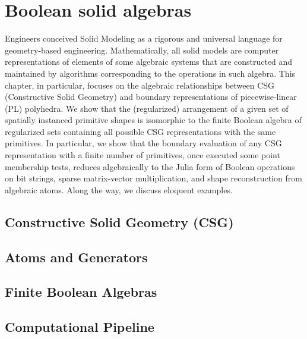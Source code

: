 
\chapter{Boolean solid algebras}
\label{chapt:8}

Engineers conceived Solid Modeling as a rigorous and universal language for geometry-based engineering. Mathematically, all solid models are computer representations of elements of some algebraic systems that are constructed and maintained by algorithms corresponding to the operations in such algebra.
This chapter, in particular, focuses on the algebraic relationships between CSG (Constructive Solid Geometry) and boundary representations of piecewise-linear (PL) polyhedra. We show that the (regularized) arrangement of a given set of spatially instanced primitive shapes is isomorphic to the finite Boolean algebra of regularized sets containing all possible CSG representations with the same primitives.
In particular, we show that the boundary evaluation of any CSG representation with a finite number of primitives, once executed some point membership tests, reduces algebraically to the Julia form of Boolean operations on bit strings, sparse matrix-vector multiplication, and shape reconstruction from algebraic atoms. Along the way, we discuss eloquent examples.

 

\section{Constructive Solid Geometry (CSG)}\label{sect:8-1}


\section{Atoms and Generators }\label{sect:8-2}


\section{Finite Boolean Algebras}\label{sect:8-3}


\section{Computational Pipeline}\label{sect:8-4}


